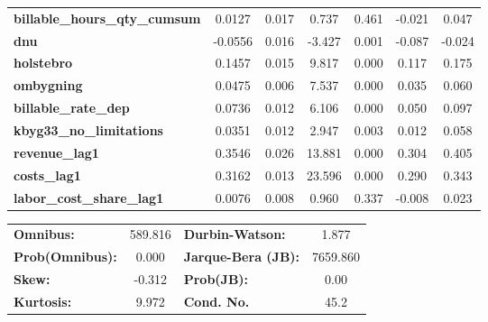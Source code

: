 \begin{center}
\begin{tabular}{lcccccc}
\textbf{billable\_hours\_qty\_cumsum}    &       0.0127  &        0.017     &     0.737  &         0.461        &       -0.021    &        0.047     \\
\textbf{dnu}                             &      -0.0556  &        0.016     &    -3.427  &         0.001        &       -0.087    &       -0.024     \\
\textbf{holstebro}                       &       0.1457  &        0.015     &     9.817  &         0.000        &        0.117    &        0.175     \\
\textbf{ombygning}                       &       0.0475  &        0.006     &     7.537  &         0.000        &        0.035    &        0.060     \\
\textbf{billable\_rate\_dep}             &       0.0736  &        0.012     &     6.106  &         0.000        &        0.050    &        0.097     \\
\textbf{kbyg33\_no\_limitations}         &       0.0351  &        0.012     &     2.947  &         0.003        &        0.012    &        0.058     \\
\textbf{revenue\_lag1}                   &       0.3546  &        0.026     &    13.881  &         0.000        &        0.304    &        0.405     \\
\textbf{costs\_lag1}                     &       0.3162  &        0.013     &    23.596  &         0.000        &        0.290    &        0.343     \\
\textbf{labor\_cost\_share\_lag1}        &       0.0076  &        0.008     &     0.960  &         0.337        &       -0.008    &        0.023     \\
\bottomrule
\end{tabular}
\begin{tabular}{lclc}
\textbf{Omnibus:}       & 589.816 & \textbf{  Durbin-Watson:     } &    1.877  \\
\textbf{Prob(Omnibus):} &   0.000 & \textbf{  Jarque-Bera (JB):  } & 7659.860  \\
\textbf{Skew:}          &  -0.312 & \textbf{  Prob(JB):          } &     0.00  \\
\textbf{Kurtosis:}      &   9.972 & \textbf{  Cond. No.          } &     45.2  \\
\bottomrule
\end{tabular}
\end{center}